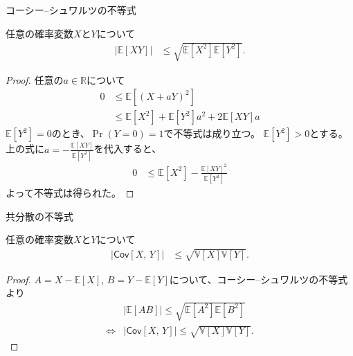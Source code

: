\documentclass[lualatex,handout]{beamer}
\newcommand{\expt}[1]{\mathbb{E}\left[#1\right]}
\newcommand{\var}[1]{\mathbb{V}\left[#1\right]}
\newcommand{\cov}[1]{\mathsf{Cov}\left[#1\right]}
\theoremstyle{definition}
\begin{document}
\begin{frame}{コーシー--シュワルツの不等式}
\small
\begin{lemma}
任意の確率変数$X$と$Y$について
\begin{align*}
|\expt{XY}|&\le\sqrt{\expt{X^2}\expt{Y^2}}.
\end{align*}
\end{lemma}
\begin{proof}
任意の$a\in\mathbb{R}$について
\begin{align*}
0&\le\expt{(X+aY)^2}\\
&\le\expt{X^2}+\expt{Y^2}a^2+2\expt{XY}a
\end{align*}
$\expt{Y^2}=0$のとき、$\Pr(Y=0)=1$で不等式は成り立つ。
$\expt{Y^2}>0$とする。
上の式に$a=-\frac{\expt{XY}}{\expt{Y^2}}$を代入すると、
\begin{align*}
0&\le \expt{X^2} - \frac{\expt{XY}^2}{\expt{Y^2}}
\end{align*}
よって不等式は得られた。
\end{proof}
\end{frame}

\begin{frame}{共分散の不等式}
\small
\begin{corollary}
任意の確率変数$X$と$Y$について
\begin{align*}
|\cov{X,\,Y}|&\le\sqrt{\var{X}\var{Y}}.
\end{align*}
\end{corollary}
\begin{proof}
$A= X - \expt{X}$,
$B= Y - \expt{Y}$について、コーシー--シュワルツの不等式より
\begin{align*}
&|\expt{AB}|\le\sqrt{\expt{A^2}\expt{B^2}}\\
\iff&|\cov{X,\,Y}|\le\sqrt{\var{X}\var{Y}}.
\end{align*}
\end{proof}
\end{frame}
\end{document}
